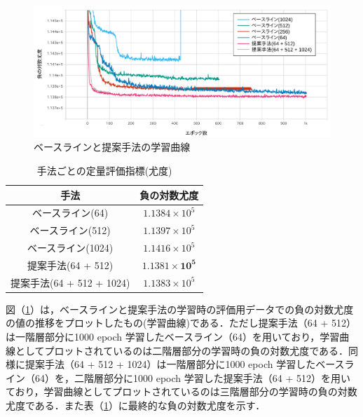 \documentclass[10pt, twocolumn]{jarticle}
\begin{document}
\begin{figure}[tp]
    \begin{center}
        \includegraphics[width=\linewidth]{./figures/curve.png}
        \caption[提案手法の学習曲線]{ベースラインと提案手法の学習曲線}
        \label{fig:curve}
    \end{center}
    \end{figure}

\begin{table}[tbp]
    \begin{center}
    \caption{手法ごとの定量評価指標(尤度)}
    \begin{tabular}{|c||c|} \hline
      手法 & 負の対数尤度 \\ \hline \hline
      ベースライン(64) & $1.1384 \times 10^5 $ \\ \hline
      ベースライン(512) & $1.1397 \times 10^5 $ \\ \hline
      ベースライン(1024) & $1.1416 \times 10^5 $ \\ \hline
      提案手法(64 + 512) & $\bm{1.1381 \times 10^5 }$ \\ \hline
      提案手法(64 + 512 + 1024) & $1.1383 \times 10^5$ \\ \hline
    \end{tabular}
    \label{table:evaluation}
    \end{center}
  \end{table}
  

図（\ref{fig:curve}）は，ベースラインと提案手法の学習時の評価用データでの負の対数尤度の値の推移をプロットしたもの(学習曲線)である．ただし提案手法（64 + 512）は一階層部分に1000 epoch 学習したベースライン（64）を用いており，学習曲線としてプロットされているのは二階層部分の学習時の負の対数尤度である．同様に提案手法（64 + 512 + 1024）は一階層部分に1000 epoch 学習したベースライン（64）を，二階層部分に1000 epoch 学習した提案手法（64 + 512）を用いており，学習曲線としてプロットされているのは三階層部分の学習時の負の対数尤度である．また表（\ref{table:evaluation}）に最終的な負の対数尤度を示す．
\end{document}
